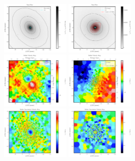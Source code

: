 \begin{figure}
      \centering
      \includegraphics[width=0.3\textwidth]{chapter4/Mmaps/ic1459_stellar_img.png}
      \includegraphics[width=0.3\textwidth]{chapter4/Mmaps/ic4296_stellar_img.png}
      \\
      \includegraphics[width=0.3\textwidth]{chapter4/Mmaps/ic1459_stellar_vel.png}
      \includegraphics[width=0.3\textwidth]{chapter4/Mmaps/ic4296_stellar_vel.png}
      \\
      \includegraphics[width=0.3\textwidth]{chapter4/Mmaps/ic1459_stellar_vel_uncert.png}
      \includegraphics[width=0.3\textwidth]{chapter4/Mmaps/ic4296_stellar_vel_uncert.png}

\end{figure}
